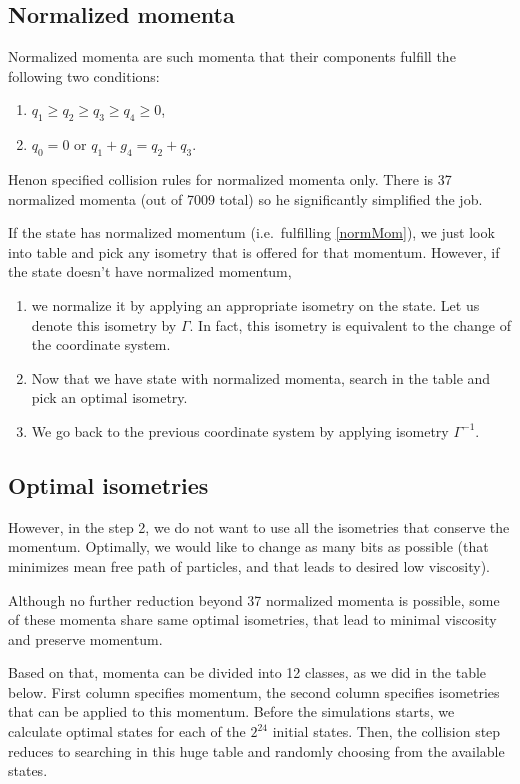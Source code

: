 \subsection{Normalized momenta}
Normalized momenta are such momenta that their components fulfill the following two conditions:
\begin{enumerate}
\item $q_1 \geq q_2 \geq q_3 \geq q_4 \geq 0$,  \label{normMom}
\item $q_0 = 0$ or $q_1+g_4 = q_2 + q_3$.
\end{enumerate}


Henon specified collision rules for normalized momenta only. There is 37 normalized momenta (out of 7009 total) so he significantly simplified the job.

If the state has normalized momentum (i.e.\ fulfilling \ref{normMom}), we just look into table and pick any isometry that is offered for that momentum. However, if the state doesn't have normalized momentum,
\begin{enumerate}
\item we normalize it by applying an appropriate isometry on the state. Let us denote this isometry by $\Gamma$. In fact, this isometry is equivalent to the change of the coordinate system.

\item Now that we have state with normalized momenta, search in the table and pick an optimal isometry.

\item We go back to the previous coordinate system by applying isometry $\Gamma^{-1}$.
\end{enumerate}

\subsection{Optimal isometries}

However, in the step 2, we do not want to use all the isometries that conserve the momentum.
Optimally, we would like to change as many bits as possible (that minimizes mean free path of particles, and that leads to desired low viscosity).

Although no further reduction beyond 37 normalized momenta is possible,
some of these momenta share same optimal isometries, that lead to minimal viscosity and preserve momentum.

Based on that,  momenta can be divided into 12 classes, as we did in the table below.
First column specifies momentum, the second column specifies isometries that can be applied to this momentum. 
Before the simulations starts, we calculate optimal states for each of the $2^{24}$ initial states. Then, the collision step reduces to searching in this huge table and randomly choosing from the available states.

